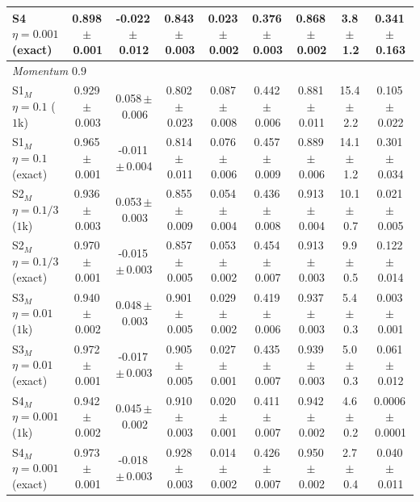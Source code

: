 \begin{table}[H]
{\begin{tabular}{l ccc cc c cc}
            S4 $\eta{=}0.001$ (exact)     & 0.898\,$\pm$\,0.001 & -0.022\,$\pm$\,0.012 & 0.843\,$\pm$\,0.003 & 0.023\,$\pm$\,0.002 & 0.376\,$\pm$\,0.003 & 0.868\,$\pm$\,0.002 & 3.8\,$\pm$\,1.2  & 0.341\,$\pm$\,0.163   \\
            \hline
            \multicolumn{9}{l}{\emph{Momentum $0.9$}}                                                                                                                                                                     \\
            S1$_M$ $\eta{=}0.1$ ($1$k)    & 0.929\,$\pm$\,0.003 & 0.058\,$\pm$\,0.006  & 0.802\,$\pm$\,0.023 & 0.087\,$\pm$\,0.008 & 0.442\,$\pm$\,0.006 & 0.881\,$\pm$\,0.011 & 15.4\,$\pm$\,2.2 & 0.105\,$\pm$\,0.022   \\
            S1$_M$ $\eta{=}0.1$ (exact)   & 0.965\,$\pm$\,0.001 & -0.011\,$\pm$\,0.004 & 0.814\,$\pm$\,0.011 & 0.076\,$\pm$\,0.006 & 0.457\,$\pm$\,0.009 & 0.889\,$\pm$\,0.006 & 14.1\,$\pm$\,1.2 & 0.301\,$\pm$\,0.034   \\
            S2$_M$ $\eta{=}0.1/3$ ($1$k)  & 0.936\,$\pm$\,0.003 & 0.053\,$\pm$\,0.003  & 0.855\,$\pm$\,0.009 & 0.054\,$\pm$\,0.004 & 0.436\,$\pm$\,0.008 & 0.913\,$\pm$\,0.004 & 10.1\,$\pm$\,0.7 & 0.021\,$\pm$\,0.005   \\
            S2$_M$ $\eta{=}0.1/3$ (exact) & 0.970\,$\pm$\,0.001 & -0.015\,$\pm$\,0.003 & 0.857\,$\pm$\,0.005 & 0.053\,$\pm$\,0.002 & 0.454\,$\pm$\,0.007 & 0.913\,$\pm$\,0.003 & 9.9\,$\pm$\,0.5  & 0.122\,$\pm$\,0.014   \\
            S3$_M$ $\eta{=}0.01$ ($1$k)   & 0.940\,$\pm$\,0.002 & 0.048\,$\pm$\,0.003  & 0.901\,$\pm$\,0.005 & 0.029\,$\pm$\,0.002 & 0.419\,$\pm$\,0.006 & 0.937\,$\pm$\,0.003 & 5.4\,$\pm$\,0.3  & 0.003\,$\pm$\,0.001   \\
            S3$_M$ $\eta{=}0.01$ (exact)  & 0.972\,$\pm$\,0.001 & -0.017\,$\pm$\,0.003 & 0.905\,$\pm$\,0.005 & 0.027\,$\pm$\,0.001 & 0.435\,$\pm$\,0.007 & 0.939\,$\pm$\,0.003 & 5.0\,$\pm$\,0.3  & 0.061\,$\pm$\,0.012   \\
            S4$_M$ $\eta{=}0.001$ ($1$k)  & 0.942\,$\pm$\,0.002 & 0.045\,$\pm$\,0.002  & 0.910\,$\pm$\,0.003 & 0.020\,$\pm$\,0.001 & 0.411\,$\pm$\,0.007 & 0.942\,$\pm$\,0.002 & 4.6\,$\pm$\,0.2  & 0.0006\,$\pm$\,0.0001 \\
            S4$_M$ $\eta{=}0.001$ (exact) & 0.973\,$\pm$\,0.001 & -0.018\,$\pm$\,0.003 & 0.928\,$\pm$\,0.003 & 0.014\,$\pm$\,0.002 & 0.426\,$\pm$\,0.007 & 0.950\,$\pm$\,0.002 & 2.7\,$\pm$\,0.4  & 0.040\,$\pm$\,0.011   \\

\end{tabular}}
\end{table}
